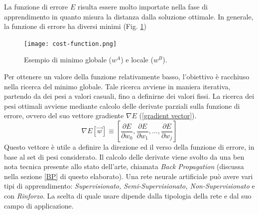 La funzione di errore $E$ risulta essere molto importate nella fase di apprendimento 
in quanto misura la distanza dalla soluzione ottimale. In generale, 
la funzione di errore ha diversi minimi (Fig. \ref{minimum and maximum})
\begin{figure}
    \centering
    \texttt{[image: cost-function.png]}
    \centering
    \caption{Esempio di minimo globale ($w^A$) e locale ($w^B$).}
    \label{minimum and maximum}
\end{figure}
Per ottenere un valore 
della funzione relativamente basso, l'obiettivo è racchiuso nella ricerca del 
minimo globale. Tale ricerca avviene in maniera iterativa, partendo da dei 
pesi a valori casuali, fino a definirne dei valori fissi. La ricerca dei pesi 
ottimali avviene mediante calcolo delle derivate parziali sulla funzione di errore, ovvero del suo vettore gradiente $\nabla{E}$ (\ref{gradient vector}). 
\begin{equation}\label{gradient vector}
    \nabla{E}[\vec{w}]\equiv\left[\frac{\partial E}{\partial w_{0}}, \frac{\partial E}{\partial w_{1}}, \dots, \frac{\partial E}{\partial w_{j}}\right]
\end{equation}
Questo vettore è utile a definire la direzione ed il verso della funzione di 
errore, in base al set di pesi considerato. Il calcolo delle derivate viene 
svolto da una ben nota tecnica presente allo stato dell'arte, chiamata \emph{Back 
Propagation} (discussa nella sezione \ref{BP} di questo elaborato). Una rete 
neurale artificiale può avere vari tipi di apprendimento: \emph{Supervisionato, 
Semi-Supervisionato, Non-Supervisionato} e con \emph{Rinforzo}. La scelta di quale 
usare dipende dalla tipologia della rete e dal suo campo di applicazione.


